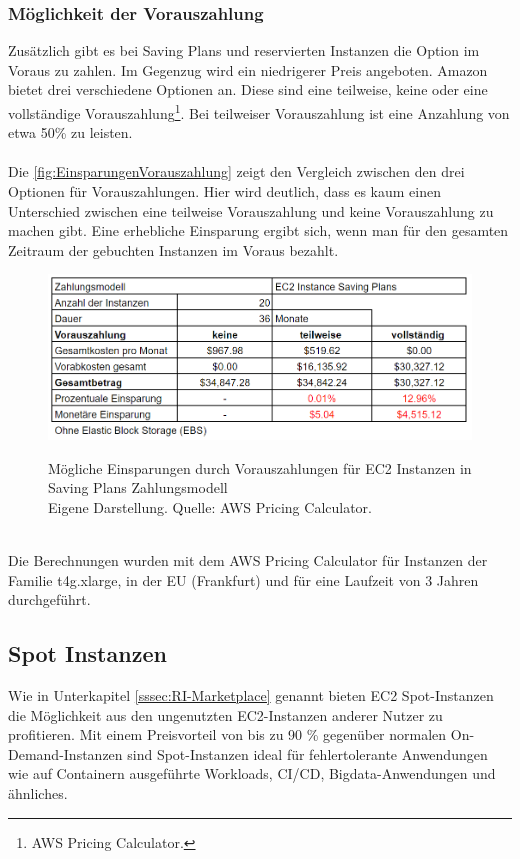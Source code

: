 \subsubsection*{Möglichkeit der Vorauszahlung}\label{sssec:Vorauszahlung}
Zusätzlich gibt es bei Saving Plans und reservierten Instanzen die Option im Voraus zu zahlen. Im Gegenzug wird ein niedrigerer Preis angeboten. Amazon bietet drei verschiedene Optionen an. Diese sind eine teilweise, keine oder eine vollständige Vorauszahlung\footnote{ AWS Pricing Calculator\cite{AMZ17}.}. Bei teilweiser Vorauszahlung ist eine Anzahlung von etwa 50\% zu leisten.
\\\\
Die \autoref{fig:EinsparungenVorauszahlung} zeigt den Vergleich zwischen den drei Optionen für Vorauszahlungen. Hier wird deutlich, dass es kaum einen Unterschied zwischen eine teilweise Vorauszahlung und keine Vorauszahlung zu machen gibt. Eine erhebliche Einsparung ergibt sich, wenn man für den gesamten Zeitraum der gebuchten Instanzen im Voraus bezahlt.
\begin{figure}[h!]
    \centering
    \includegraphics[scale=0.6]{sources/EinsparungenVorauszahlung}\label{fig:EinsparungenVorauszahlung}\\
    \caption[Mögliche Einsparungen durch Vorauszahlungen]{}
    \label{fig:EinsparungenVorauszahlung}Mögliche Einsparungen durch Vorauszahlungen für EC2 Instanzen in Saving Plans Zahlungsmodell\\
    Eigene Darstellung. Quelle: {AWS Pricing Calculator\cite{AMZ17}.}
  \end{figure}
  \\
Die Berechnungen wurden mit dem AWS Pricing Calculator {\cite{AMZ17}} für Instanzen der Familie t4g.xlarge, in der EU (Frankfurt) und für eine Laufzeit von 3 Jahren durchgeführt. 
\subsection{Spot Instanzen }\label{ssec:Spot-Instances}
Wie in Unterkapitel \ref{sssec:RI-Marketplace} genannt bieten EC2 Spot-Instanzen die Möglichkeit aus den ungenutzten EC2-Instanzen anderer Nutzer zu profitieren. 
Mit einem Preisvorteil von bis zu 90 \% gegenüber normalen On-Demand-Instanzen sind Spot-Instanzen ideal für fehlertolerante Anwendungen wie auf Containern ausgeführte Workloads, CI/CD, Bigdata-Anwendungen und ähnliches.

